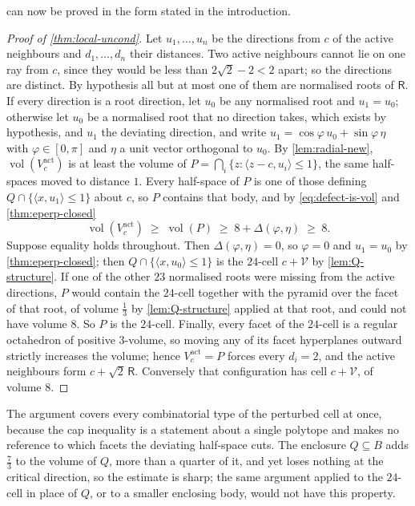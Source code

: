 \documentclass[11pt,reqno]{amsart}
\renewcommand{\_}{\origunderscore\allowbreak}
\numberwithin{equation}{section}
\theoremstyle{plain}
\theoremstyle{definition}
\theoremstyle{remark}
\newcommand{\Rt}{\mathsf{R}}                 %
\newcommand{\VCell}{\mathcal{V}}             %
\newcommand{\tilt}{\varphi}                  %
\newcommand{\dev}{\eta}                      %
\newcommand{\defect}{\Delta}                 %
\newcommand{\base}{u}                        %
\DeclareMathOperator{\vol}{vol}
\begin{document}
 can now be proved in the form stated in the
introduction.

\begin{proof}[Proof of \cref{thm:local-uncond}]
Let $u_1,\dots,u_n$ be the directions from $c$ of the active neighbours
and $d_1,\dots,d_n$ their distances. Two active neighbours cannot lie on
one ray from $c$, since they would be less than $2\sqrt2-2<2$ apart; so
the directions are distinct. By hypothesis all but at most one of them are
normalised roots of $\Rt$. If every direction is a root direction, let
$\base_0$ be any normalised root and $\base_1=\base_0$; otherwise let
$\base_0$ be a normalised root that no direction takes, which exists by
hypothesis, and $\base_1$ the deviating direction, and write
$\base_1=\cos\tilt\,\base_0+\sin\tilt\,\dev$ with $\tilt\in[0,\pi]$ and
$\dev$ a unit vector orthogonal to $\base_0$. By \cref{lem:radial-new},
$\vol(V_c^{\mathrm{act}})$ is at least the volume of
$P=\bigcap_i\{z:\langle z-c,u_i\rangle\le1\}$, the same half-spaces moved
to distance $1$. Every half-space of $P$ is one of those defining
$Q\cap\{\langle x,\base_1\rangle\le1\}$ about $c$, so $P$ contains that
body, and by \cref{eq:defect-is-vol} and \cref{thm:eperp-closed}
\[
  \vol(V_c^{\mathrm{act}})\;\ge\;\vol(P)\;\ge\;8+\defect(\tilt,\dev)\;\ge\;8 .
\]
Suppose equality holds throughout. Then $\defect(\tilt,\dev)=0$, so
$\tilt=0$ and $\base_1=\base_0$ by \cref{thm:eperp-closed}; then
$Q\cap\{\langle x,\base_0\rangle\le1\}$ is the $24$-cell $c+\VCell$ by
\cref{lem:Q-structure}. If one of the other $23$ normalised roots were
missing from the active directions, $P$ would contain the $24$-cell
together with the pyramid over the facet of that root, of volume
$\tfrac13$ by \cref{lem:Q-structure} applied at that root, and could not
have volume $8$. So $P$ is the $24$-cell. Finally, every facet of the
$24$-cell is a regular octahedron of positive $3$-volume, so moving any of
its facet hyperplanes outward strictly increases the volume; hence
$V_c^{\mathrm{act}}=P$ forces every $d_i=2$, and the active neighbours
form $c+\sqrt2\,\Rt$. Conversely that configuration has cell $c+\VCell$, of
volume $8$.
\end{proof}

The argument covers every combinatorial type of the perturbed cell at
once, because the cap inequality is a statement about a single polytope
and makes no reference to which facets the deviating half-space cuts. The
enclosure
$Q\subseteq B$ adds $\tfrac73$ to the volume of $Q$, more than a quarter of
it, and yet loses nothing at the critical direction, so the estimate is sharp; the same
argument applied to the $24$-cell in place of $Q$, or to a smaller
enclosing body, would not have this property.
\end{document}

